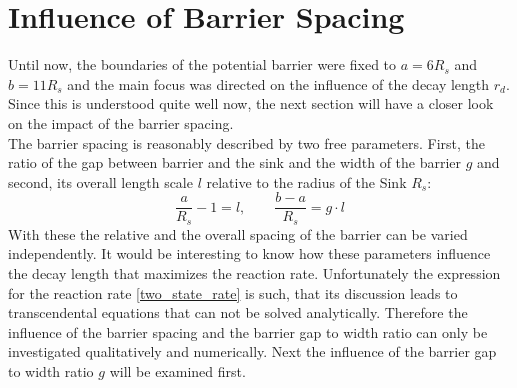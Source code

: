 \section{Influence of Barrier Spacing}
Until now, the boundaries of the potential barrier were fixed to $a=6 R_s$ and $b=11R_s$ and the main focus was directed on the influence of the decay length $r_d$. Since this is understood quite well now, the next section will have a closer look on the impact of the barrier spacing.\\
The barrier spacing is reasonably described by two free parameters. First, the ratio of the gap between barrier and the sink and the width of the barrier $g$ and second, its overall length scale $l$ relative to the radius of the Sink $R_s$:
\begin{equation}
    \frac{a}{R_s} - 1 = l, \qquad \frac{b-a}{R_s} = g \cdot l
    \label{spacing_variables}
\end{equation}
With these the relative and the overall spacing of the barrier can be varied independently. 
It would be interesting to know how these parameters influence the decay length that maximizes the reaction rate. Unfortunately the expression for the reaction rate \eqref{two_state_rate} is such, that its discussion leads to transcendental equations that can not be solved analytically. Therefore the influence of the barrier spacing and the barrier gap to width ratio can only be investigated qualitatively and numerically. Next the influence of the barrier gap to width ratio $g$ will be examined first. \\

